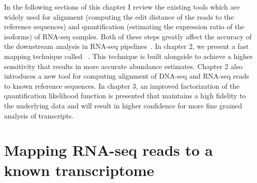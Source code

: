 In the following sections of this chapter I review the existing tools which 
are widely used for alignment (computing the edit distance of the reads to 
the reference sequences) and quantification (estimating the expression ratio 
of the isoforms) of RNA-seq samples. Both of these steps greatly affect the 
accuracy of the downstream analysis in RNA-seq 
pipelines~\citep{srivastava2019alignment}. In chapter 2, 
we present a fast mapping technique called \sla~\citep{selaln}. This technique is built 
alongside \qm to achieve a higher sensitivity that results in more 
accurate abundance estimates. Chapter 2 also introduces a new tool for 
computing alignment of DNA-seq and RNA-seq reads to known reference sequences. 
In chapter 3, an improved factorization of the quantification likelihood 
function is presented that maintains a high fidelity to the underlying 
data and will result in higher confidence for more fine grained analysis 
of transcripts. 

\section{Mapping RNA-seq reads to a known transcriptome}

